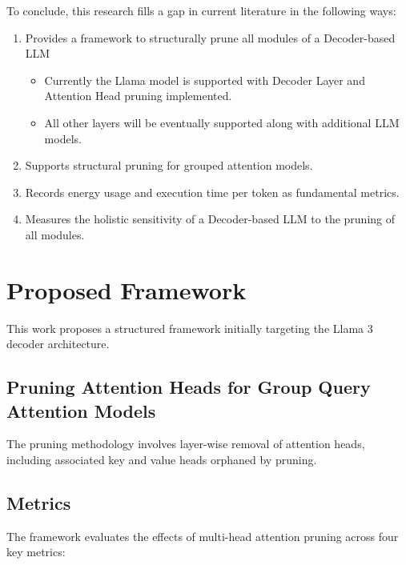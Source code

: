 \documentclass[conference]{IEEEtran}
\begin{document}
    To conclude, this research fills a gap in current literature in the following ways:

    \begin{enumerate}
        \item Provides a framework to structurally prune all modules of a Decoder-based LLM
        \begin{itemize}
            \item Currently the Llama model is supported with Decoder Layer and Attention Head pruning implemented.
            \item All other layers will be eventually supported along with additional LLM models.
        \end{itemize}
        \item Supports structural pruning for grouped attention models.
        \item Records energy usage and execution time per token as fundamental metrics.
        \item Measures the holistic sensitivity of a Decoder-based LLM to the pruning of all modules.
    \end{enumerate}

    \section{Proposed Framework}
    This work proposes a structured framework initially targeting the Llama 3 decoder architecture.

    \subsection{Pruning Attention Heads for Group Query Attention Models}

    The pruning methodology involves layer-wise removal of attention heads, including associated key and value heads orphaned by pruning.

    \subsection{Metrics}

    The framework evaluates the effects of multi-head attention pruning across four key metrics:
\end{document}
